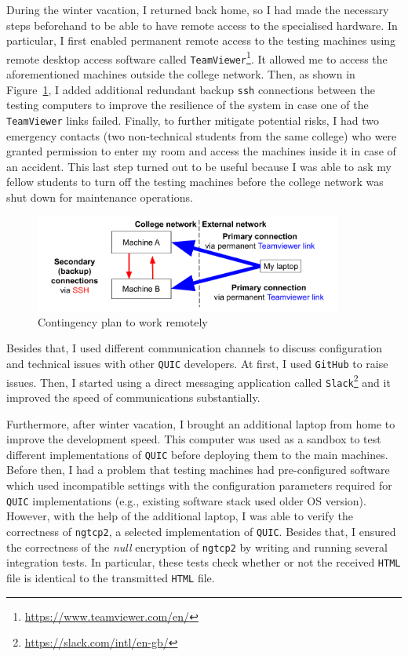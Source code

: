 \documentclass[12pt,a4paper]{report}
\begin{document}
    During the winter vacation, I returned back home, so I had made the necessary steps beforehand to be able to have remote access to the specialised hardware.
    In particular, I first enabled permanent remote access to the testing machines using remote desktop access software called \texttt{TeamViewer}\footnote{\url{https://www.teamviewer.com/en/}}.
    It allowed me to access the aforementioned machines outside the college network.
    Then, as shown in Figure~\ref{fig:setup_map}, I added additional redundant backup \texttt{ssh} connections between the testing computers to improve the resilience of the system in case one of the \texttt{TeamViewer} links failed.
    Finally, to further mitigate potential risks, I had two emergency contacts (two non-technical students from the same college) who were granted permission to enter my room and access the machines inside it in case of an accident.
    This last step turned out to be useful because I was able to ask my fellow students to turn off the testing machines before the college network was shut down for maintenance operations.
    

    \begin{figure}[H]
    \centering
    \includegraphics[width=0.9\textwidth]{figs/Setup map.png}
    \caption[Contingency plan to work remotely]{Contingency plan to work remotely}
    \label{fig:setup_map}
    \end{figure}

    Besides that, I used different communication channels to discuss configuration and technical issues with other \texttt{QUIC} developers.
    At first, I used \texttt{GitHub} to raise issues.
    Then, I started using a direct messaging application called \texttt{Slack}\footnote{\url{https://slack.com/intl/en-gb/}} 
    and it improved the speed of communications substantially.

    Furthermore, after winter vacation, I brought an additional laptop from home to improve the development speed.
    This computer was used as a sandbox to test different implementations of \texttt{QUIC} before deploying them to the main machines.
    Before then, I had a problem that testing machines had pre-configured software which used incompatible settings with the configuration parameters required for \texttt{QUIC} implementations (e.g., existing software stack used older OS version).
    However, with the help of the additional laptop, I was able to verify the correctness of \texttt{ngtcp2}, a selected implementation of \texttt{QUIC}.
    Besides that, I ensured the correctness of the \textit{null} encryption of \texttt{ngtcp2} by writing and running several integration tests.
    In particular, these tests check whether or not the received \texttt{HTML} file is identical to the transmitted \texttt{HTML} file.
    
\end{document}
